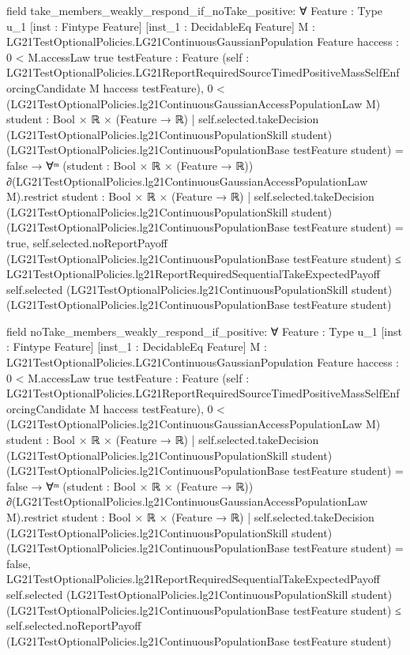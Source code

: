 \documentclass[10pt]{article}
\begin{document}
\begin{ReviewVerbatim}
field take_members_weakly_respond_if_noTake_positive:
∀ {Feature : Type u_1} [inst : Fintype Feature] [inst_1 : DecidableEq Feature]
  {M : LG21TestOptionalPolicies.LG21ContinuousGaussianPopulation Feature} {haccess : 0 < M.accessLaw {true}}
  {testFeature : Feature}
  (self :
    LG21TestOptionalPolicies.LG21ReportRequiredSourceTimedPositiveMassSelfEnforcingCandidate M haccess testFeature),
  0 <
      (LG21TestOptionalPolicies.lg21ContinuousGaussianAccessPopulationLaw M)
        {student : Bool × ℝ × (Feature → ℝ) |
          self.selected.takeDecision (LG21TestOptionalPolicies.lg21ContinuousPopulationSkill student)
              (LG21TestOptionalPolicies.lg21ContinuousPopulationBase testFeature student) =
            false} →
    ∀ᵐ (student :
      Bool ×
        ℝ ×
          (Feature →
            ℝ)) ∂(LG21TestOptionalPolicies.lg21ContinuousGaussianAccessPopulationLaw M).restrict
        {student : Bool × ℝ × (Feature → ℝ) |
          self.selected.takeDecision (LG21TestOptionalPolicies.lg21ContinuousPopulationSkill student)
              (LG21TestOptionalPolicies.lg21ContinuousPopulationBase testFeature student) =
            true},
      self.selected.noReportPayoff (LG21TestOptionalPolicies.lg21ContinuousPopulationBase testFeature student) ≤
        LG21TestOptionalPolicies.lg21ReportRequiredSequentialTakeExpectedPayoff self.selected
          (LG21TestOptionalPolicies.lg21ContinuousPopulationSkill student)
          (LG21TestOptionalPolicies.lg21ContinuousPopulationBase testFeature student)

field noTake_members_weakly_respond_if_positive:
∀ {Feature : Type u_1} [inst : Fintype Feature] [inst_1 : DecidableEq Feature]
  {M : LG21TestOptionalPolicies.LG21ContinuousGaussianPopulation Feature} {haccess : 0 < M.accessLaw {true}}
  {testFeature : Feature}
  (self :
    LG21TestOptionalPolicies.LG21ReportRequiredSourceTimedPositiveMassSelfEnforcingCandidate M haccess testFeature),
  0 <
      (LG21TestOptionalPolicies.lg21ContinuousGaussianAccessPopulationLaw M)
        {student : Bool × ℝ × (Feature → ℝ) |
          self.selected.takeDecision (LG21TestOptionalPolicies.lg21ContinuousPopulationSkill student)
              (LG21TestOptionalPolicies.lg21ContinuousPopulationBase testFeature student) =
            false} →
    ∀ᵐ (student :
      Bool ×
        ℝ ×
          (Feature →
            ℝ)) ∂(LG21TestOptionalPolicies.lg21ContinuousGaussianAccessPopulationLaw M).restrict
        {student : Bool × ℝ × (Feature → ℝ) |
          self.selected.takeDecision (LG21TestOptionalPolicies.lg21ContinuousPopulationSkill student)
              (LG21TestOptionalPolicies.lg21ContinuousPopulationBase testFeature student) =
            false},
      LG21TestOptionalPolicies.lg21ReportRequiredSequentialTakeExpectedPayoff self.selected
          (LG21TestOptionalPolicies.lg21ContinuousPopulationSkill student)
          (LG21TestOptionalPolicies.lg21ContinuousPopulationBase testFeature student) ≤
        self.selected.noReportPayoff (LG21TestOptionalPolicies.lg21ContinuousPopulationBase testFeature student)


\end{ReviewVerbatim}
\end{document}
